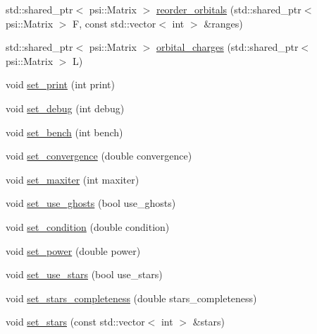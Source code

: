 \begin{DoxyCompactItemize}
\item 
std\+::shared\+\_\+ptr$<$ psi\+::\+Matrix $>$ \mbox{\hyperlink{classforte_1_1_i_a_o_builder_a490572f40cf430c4f6df62f8dd9e1396}{reorder\+\_\+orbitals}} (std\+::shared\+\_\+ptr$<$ psi\+::\+Matrix $>$ F, const std\+::vector$<$ int $>$ \&ranges)
\item 
std\+::shared\+\_\+ptr$<$ psi\+::\+Matrix $>$ \mbox{\hyperlink{classforte_1_1_i_a_o_builder_abb489fb8d722eac6991207c36ecd641d}{orbital\+\_\+charges}} (std\+::shared\+\_\+ptr$<$ psi\+::\+Matrix $>$ L)
\item 
void \mbox{\hyperlink{classforte_1_1_i_a_o_builder_ab0e415a558f56d41046032bb8a94f7f1}{set\+\_\+print}} (int print)
\item 
void \mbox{\hyperlink{classforte_1_1_i_a_o_builder_afdcf2b546c279c5ac007fb24c69d4497}{set\+\_\+debug}} (int debug)
\item 
void \mbox{\hyperlink{classforte_1_1_i_a_o_builder_acbe8fa18ebb99b16469a7673a9335113}{set\+\_\+bench}} (int bench)
\item 
void \mbox{\hyperlink{classforte_1_1_i_a_o_builder_a4fca834cfbe2c3e80d3538e830dcded3}{set\+\_\+convergence}} (double convergence)
\item 
void \mbox{\hyperlink{classforte_1_1_i_a_o_builder_ad7fd1f9976ff0e9a399e279d3258cd4b}{set\+\_\+maxiter}} (int maxiter)
\item 
void \mbox{\hyperlink{classforte_1_1_i_a_o_builder_a128e87f6020e9906fb30f13a5334127e}{set\+\_\+use\+\_\+ghosts}} (bool use\+\_\+ghosts)
\item 
void \mbox{\hyperlink{classforte_1_1_i_a_o_builder_a99571044f2ec8d097bbf518382953e28}{set\+\_\+condition}} (double condition)
\item 
void \mbox{\hyperlink{classforte_1_1_i_a_o_builder_aef7358d64fc4457ab9d73d969b229f93}{set\+\_\+power}} (double power)
\item 
void \mbox{\hyperlink{classforte_1_1_i_a_o_builder_a12bb32fbacc625f873b8788c866eee91}{set\+\_\+use\+\_\+stars}} (bool use\+\_\+stars)
\item 
void \mbox{\hyperlink{classforte_1_1_i_a_o_builder_a0b102cddcefcb9791e94dd0953387893}{set\+\_\+stars\+\_\+completeness}} (double stars\+\_\+completeness)
\item 
void \mbox{\hyperlink{classforte_1_1_i_a_o_builder_abc7accdd551c9dcf7e5cef1ab32f1bcd}{set\+\_\+stars}} (const std\+::vector$<$ int $>$ \&stars)
\end{DoxyCompactItemize}
